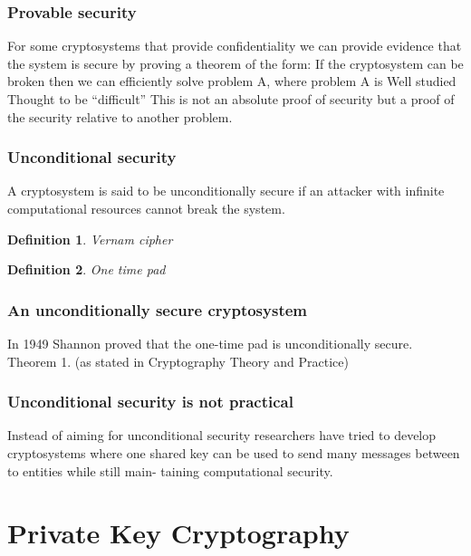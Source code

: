 \documentclass{article}
\theoremstyle{quest}
\newtheorem*{definition}{Definition}
\begin{document}
\subsubsection{Provable security}
For some cryptosystems that provide confidentiality we can provide evidence that the system is secure by proving a theorem of the form:
If the cryptosystem can be broken then we can efficiently solve problem A, where problem A is
 Well studied
 Thought to be “difficult”
This is not an absolute proof of security but a proof of the security relative to another problem.

\subsubsection{Unconditional security}
A cryptosystem is said to be unconditionally secure if an attacker with infinite computational resources cannot break the system.

\begin{definition}
	\textit{Vernam cipher}
\end{definition}

\begin{definition}
	\textit{One time pad}
\end{definition}

\subsubsection{An unconditionally secure cryptosystem}
In 1949 Shannon proved that the one-time pad is unconditionally secure.
Theorem 1.
(as stated in Cryptography Theory and Practice)

\subsubsection{Unconditional security is not practical}

Instead of aiming for unconditional security researchers have tried to develop cryptosystems where one shared key can be used to send many messages between to entities while still main- taining computational security.

\section{Private Key Cryptography}
\end{document}
